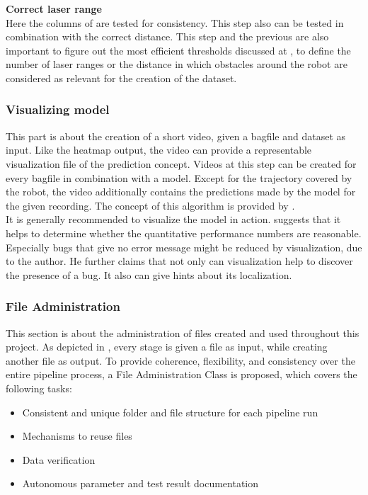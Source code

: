 \textbf{Correct laser range}\\
Here the columns of  are tested for consistency. This step also can be tested in combination with the correct distance. This step and the previous are also important to figure out the most efficient thresholds discussed at , to define the number of laser ranges or the distance in which obstacles around the robot are considered as relevant for the creation of the dataset.\\

\subsubsection{Visualizing model \label{visualizing} }
This part is about the creation of a short video, given a bagfile and dataset as input. Like the heatmap output, the video can provide a representable visualization file of the prediction concept. Videos at this step can be created for every bagfile in combination with a model. Except for the trajectory covered by the robot, the video additionally contains the predictions made by the model for the given recording. The concept of this algorithm is provided by \cite{nava2019learning}.\\

It is generally recommended to visualize the model in action. \cite{Goodfellow-et-al-2016} suggests that it helps to determine whether the quantitative performance numbers are reasonable. Especially bugs that give no error message might be reduced by visualization, due to the author. He further claims that not only can visualization help to discover the presence of a bug. It also can give hints about its localization.

\subsubsection{File Administration \label{file_administration} }
This section is about the administration of files created and used throughout this project. As depicted in , every stage is given a file as input, while creating another file as output. To provide coherence, flexibility, and consistency over the entire pipeline process, a File Administration Class is proposed, which covers the following tasks:

\begin{itemize}
\item Consistent and unique folder and file structure for each pipeline run
\item Mechanisms to reuse files
\item Data verification
\item Autonomous parameter and test result documentation
\end{itemize}

